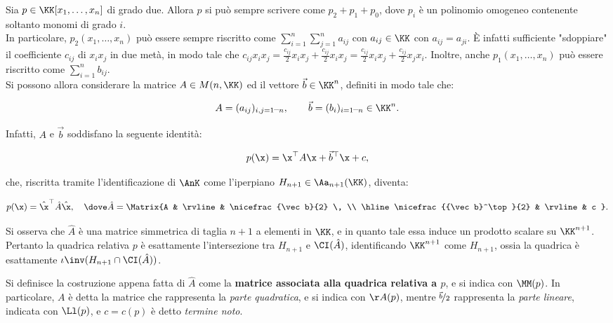\documentclass[11pt]{article}
\begin{document}
	\begin{remark} 
		Sia $p \in \KK[x_1, \ldots, x_n]$ di grado due. Allora $p$ si può sempre scrivere come $p_2 + p_1 + p_0$,
		dove $p_i$ è un polinomio omogeneo contenente soltanto monomi di grado $i$. \\
		
		In particolare, $p_2(x_1, \ldots, x_n)$ può essere sempre riscritto come $\sum_{i=1}^n \sum_{j=1}^n a_{ij}$
		con $a_{ij} \in \KK$ con $a_{ij} = a_{ji}$.
		È infatti sufficiente "sdoppiare" il coefficiente $c_{ij}$
		di $x_i x_j$ in due metà, in modo tale che $c_{ij} x_i x_j = \frac{c_{ij}}{2} x_i x_j + \frac{c_{ij}}{2} x_i x_j = \frac{c_{ij}}{2} x_i x_j + \frac{c_{ij}}{2} x_j x_i$. Inoltre, anche $p_1(x_1, \ldots, x_n)$ può essere  riscritto come $\sum_{i=1}^n b_{ij}$. \\
		
		Si possono allora considerare la matrice $A \in M(n, \KK)$ ed il vettore $\vec b \in \KK^n$, definiti in modo tale che:
		
		\[ A = (a_{ij})_{i,j=1\mbox{--}n}, \qquad \vec b = (b_i)_{i=1\mbox{--}n} \in \KK^n. \]
		
		\vskip 0.05in
		
		Infatti, $A$ e $\vec b$ soddisfano la seguente identità:
		
		\[ p(\x) = \x^\top A \x + \vec b^\top \x + c, \]
		
		\vskip 0.05in
		
		che, riscritta tramite l'identificazione di $\AnK$ come l'iperpiano $H_{n+1} \in \Aa_{n+1}(\KK)$,
		diventa:
		
		\[ p(\x) = {\hat \x}^\top \hat A \hat \x, \quad \dove \hat A = \Matrix{A & \rvline & \nicefrac{\vec b}{2} \, \\ \hline \nicefrac{{\vec b}^\top}{2} & \rvline & c }. \]
		
		\vskip 0.05in
		
		Si osserva che $\hat A$ è una matrice simmetrica di taglia $n+1$ a elementi in $\KK$, e in quanto
		tale essa induce un prodotto scalare su $\KK^{n+1}$. Pertanto la quadrica relativa $p$ è esattamente
		l'intersezione tra $H_{n+1}$ e $\CI(\hat A)$, identificando $\KK^{n+1}$ come $H_{n+1}$, ossia
		la quadrica è esattamente $\iota\inv(H_{n+1} \cap \CI(\hat A))$.
	\end{remark}
	
	\begin{definition}
		Si definisce la costruzione appena fatta di $\hat A$ come la \textbf{matrice associata alla quadrica relativa a $p$}, e si indica con $\MM(p)$. In particolare, $A$ è detta la matrice che rappresenta la \textit{parte quadratica}, e si indica con $\AA(p)$, mentre $\nicefrac{\vec b}2$ rappresenta la \textit{parte lineare}, indicata con $\Ll(p)$,
		e $c = c(p)$ è detto \textit{termine noto}.
	\end{definition}
	
\end{document}
